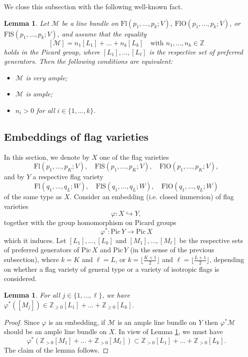 \documentclass[12pt]{amsart}
\newcommand{\Flags}{\mathrm{Fl}}
\newcommand{\OFlags}{\mathrm{FlO}}
\newcommand{\SFlags}{\mathrm{FlS}}
\newcommand{\Pic}{\mathrm{Pic}}
\newtheorem{lemma}[theorem]{Lemma}
\theoremstyle{definition}
\begin{document}
\bigskip

We close this subsection with the following well-known fact.

\begin{lemma}
\label{L3.1}
Let $\mathcal{M}$ be a line bundle on $\Flags(p_1,\ldots,p_k;V)$, $\OFlags(p_1,\ldots,p_k;V)$, or $\SFlags(p_1,\ldots,p_k;V)$, and assume that the equality 
$$[\mathcal{M}]=n_1[L_1]+\ldots+n_{k}[L_{k}]\quad\mbox{with $n_1,\ldots,n_{k}\in\mathbb{Z}$}$$
holds in the Picard group, where $[L_1],\ldots,[L_\ell]$ is the respective set of preferred generators. Then the following conditions are equivalent:
\begin{itemize}
\item[\rm (i)] $\mathcal{M}$ is very ample; 
\item[\rm (ii)] $\mathcal{M}$ is ample;
\item[\rm (iii)] $n_i>0$ for all $i\in\{1,\ldots,k\}$.
\end{itemize}
\end{lemma}

\subsection{Embeddings of flag varieties}

In this section, we denote by $X$ one of the flag varieties
$$\Flags(p_1,\ldots,p_K;V),\quad\SFlags(p_1,\ldots,p_{K};V),\quad \OFlags(p_1,\ldots,p_{K};V),$$ 
and by $Y$ a respective flag variety
$$\Flags(q_1,\ldots,q_L;W),\quad\SFlags(q_1,\ldots,q_{L};W),\quad\OFlags(q_1,\ldots,q_{L};W)$$
of the same type as $X$.  
Consider an embedding (i.e. closed immersion) of flag varieties
\[\varphi:X\hookrightarrow Y,\]
together with the group homomorphism on Picard groups
\[\varphi^*:\Pic\,Y\to\Pic\,X\]
which it induces. 
Let
$[L_1],\ldots,[L_{k}]$ and $[M_1],\ldots,[M_{\ell}]$ be the respective sets of preferred generators of $\Pic\,X$ and $\Pic\,Y$ (in the sense of the previous subsection), where $k=K$ and $\ell=L$, or $k=\lfloor\frac{K+1}{2}\rfloor$ and $\ell=\lfloor\frac{L+1}{2}\rfloor$, depending on whether a flag variety of general type or a variety of isotropic flags is considered.


\begin{lemma}
\label{L-3.2}
For all $j\in\{1,\ldots,\ell\}$, we have $\varphi^*([M_j])\in \mathbb{Z}_{\geq 0}[L_1]+\ldots+\mathbb{Z}_{\geq 0}[L_{k}]$.
\end{lemma}

\begin{proof}
Since $\varphi$ is an embedding, if $\mathcal{M}$ is an ample line bundle on $Y$ then $\varphi^*\mathcal{M}$ should be an ample line bundle on $X$. In view of Lemma \ref{L3.1}, we must have
\[\varphi^*(\mathbb{Z}_{>0}[M_1]+\ldots+\mathbb{Z}_{>0}[M_{\ell}])\subset \mathbb{Z}_{>0}[L_1]+\ldots+\mathbb{Z}_{>0}[L_{k}].\]
The claim of the lemma follows.
\end{proof}
\end{document}
